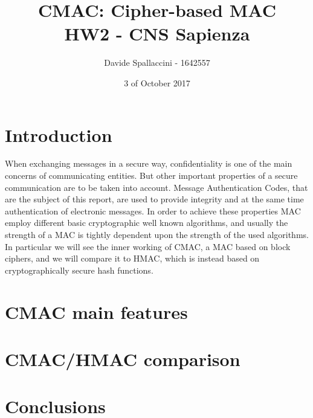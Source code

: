 \documentclass[11pt]{article}
\begin{document}
\title{CMAC: Cipher-based MAC\\ HW2 - CNS Sapienza}
\author{Davide Spallaccini - 1642557}
\date{3 of October 2017}
\maketitle


\section{Introduction}
When exchanging messages in a secure way, confidentiality is one of the main concerns of communicating entities. But other important properties of a secure communication are to be taken into account. Message Authentication Codes, that are the subject of this report, are used to provide integrity and at the same time authentication of electronic messages. In order to achieve these properties MAC employ different basic cryptographic well known algorithms, and usually the strength of a MAC is tightly dependent upon the strength of the used algorithms. In particular we will see the inner working of CMAC, a MAC based on block ciphers, and we will compare it to HMAC, which is instead based on cryptographically secure hash functions.

\section{CMAC main features}


\section{CMAC/HMAC comparison}


\section{Conclusions}
\end{document}
